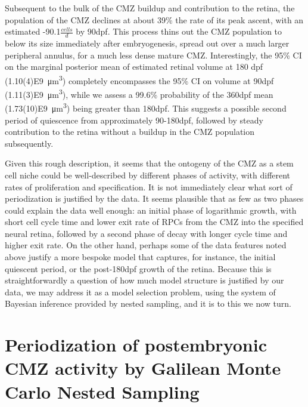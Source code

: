 Subsequent to the bulk of the CMZ buildup and contribution to the retina, the population of the CMZ declines at about 39\% the rate of its peak ascent, with an estimated -90.1$\frac{cells}{d}$ by 90dpf. This process thins out the CMZ population to below its size immediately after embryogenesis, spread out over a much larger peripheral annulus, for a much less dense mature CMZ. Interestingly, the 95\% CI on the marginal posterior mean of estimated retinal volume at 180 dpf (\SI{1.10(4)E9}{\cubic\micro\metre}) completely encompasses the 95\% CI on volume at 90dpf (\SI{1.11(3)E9}{\cubic\micro\metre}), while we assess a 99.6\% probability of the 360dpf mean (\SI{1.73(10)E9}{\cubic\micro\metre}) being greater than 180dpf. This suggests a possible second period of quiescence from approximately 90-180dpf, followed by steady contribution to the retina without a buildup in the CMZ population subsequently.

Given this rough description, it seems that the ontogeny of the CMZ as a stem cell niche could be well-described by different phases of activity, with different rates of proliferation and specification. It is not immediately clear what sort of periodization is justified by the data. It seems plausible that as few as two phases could explain the data well enough: an initial phase of logarithmic growth, with short cell cycle time and lower exit rate of RPCs from the CMZ into the specified neural retina, followed by a second phase of decay with longer cycle time and higher exit rate. On the other hand, perhaps some of the data features noted above justify a more bespoke model that captures, for instance, the initial quiescent period, or the post-180dpf growth of the retina. Because this is straightforwardly a question of how much model structure is justified by our data, we may address it as a model selection problem, using the system of Bayesian inference provided by nested sampling, and it is to this we now turn.

\section{Periodization of postembryonic CMZ activity by Galilean Monte Carlo Nested Sampling}

